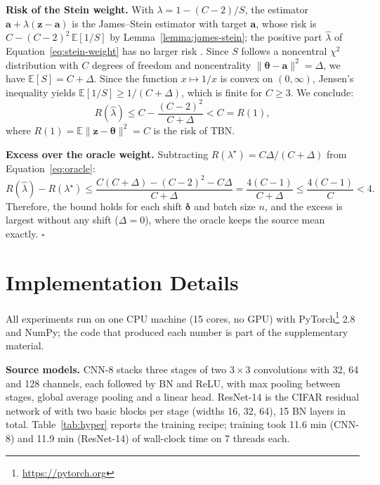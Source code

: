 \textbf{Risk of the Stein weight.} With $\lambda = 1 - (C-2)/S$, the estimator $\mathbf{a} + \lambda(\mathbf{z} - \mathbf{a})$ is the James--Stein estimator with target $\mathbf{a}$, whose risk is $C - (C-2)^2\,\mathbb{E}[1/S]$ by Lemma~\ref{lemma:james-stein}; the positive part $\hat{\lambda}$ of Equation~\ref{eq:stein-weight} has no larger risk \cite{Efron-Morris}.
Since $S$ follows a noncentral $\chi^2$ distribution with $C$ degrees of freedom and noncentrality $\|\boldsymbol{\theta} - \mathbf{a}\|^2 = \Delta$, we have $\mathbb{E}[S] = C + \Delta$.
Since the function $x \mapsto 1/x$ is convex on $(0, \infty)$, Jensen's inequality yields $\mathbb{E}[1/S] \ge 1/(C + \Delta)$, which is finite for $C \ge 3$.
We conclude:
\begin{equation*}
R(\hat{\lambda}) \le C - \frac{(C-2)^2}{C + \Delta} < C = R(1),
\end{equation*}
where $R(1) = \mathbb{E}\|\mathbf{z} - \boldsymbol{\theta}\|^2 = C$ is the risk of TBN.

\textbf{Excess over the oracle weight.} Subtracting $R(\lambda^{\star}) = C\Delta/(C + \Delta)$ from Equation~\ref{eq:oracle}:
\begin{equation*}
R(\hat{\lambda}) - R(\lambda^{\star}) \le \frac{C(C + \Delta) - (C-2)^2 - C\Delta}{C + \Delta} = \frac{4(C-1)}{C + \Delta} \le \frac{4(C-1)}{C} < 4.
\end{equation*}
Therefore, the bound holds for each shift $\boldsymbol{\delta}$ and batch size $n$, and the excess is largest without any shift ($\Delta = 0$), where the oracle keeps the source mean exactly. \hfill$\square$

\clearpage
\section{Implementation Details} \label{apdx:impl-details}
All experiments run on one CPU machine (15 cores, no GPU) with PyTorch\footnote{\url{https://pytorch.org}} 2.8 and NumPy; the code that produced each number is part of the supplementary material.

\textbf{Source models.} CNN-8 stacks three stages of two $3{\times}3$ convolutions with 32, 64 and 128 channels, each followed by BN and ReLU, with max pooling between stages, global average pooling and a linear head. ResNet-14 is the CIFAR residual network of \citet{ResNet} with two basic blocks per stage (widths 16, 32, 64), 15 BN layers in total. Table~\ref{tab:hyper} reports the training recipe; training took 11.6 min (CNN-8) and 11.9 min (ResNet-14) of wall-clock time on 7 threads each.

